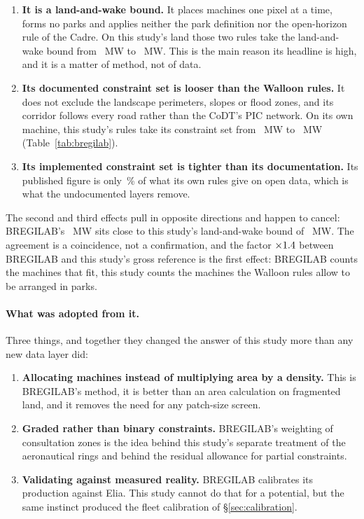\documentclass[11pt,a4paper]{article}
\begin{document}
\begin{enumerate}
  \item \textbf{It is a land-and-wake bound.} It places machines one pixel at a
    time, forms no parks and applies neither the park definition nor the
    open-horizon rule of the Cadre. On this study's land those two rules take
    the land-and-wake bound from \FreePnom{}~MW to \PlacePnom{}~MW. This is the
    main reason its headline is high, and it is a matter of method, not of
    data.
  \item \textbf{Its documented constraint set is looser than the Walloon
    rules.} It does not exclude the landscape perimeters, slopes or flood zones,
    and its corridor follows every road rather than the CoDT's PIC network. On
    its own machine, this study's rules take its constraint set from
    \BregEmuGrossMW{}~MW to \BregBridgeEndMW{}~MW (Table~\ref{tab:bregilab}).
  \item \textbf{Its implemented constraint set is tighter than its
    documentation.} Its published figure is only \BregReportedShare{}\,\% of
    what its own rules give on open data, which is what the undocumented layers
    remove.
\end{enumerate}

The second and third effects pull in opposite directions and happen to cancel:
BREGILAB's \BregTotal{}~MW sits close to this study's land-and-wake bound of
\FreePnom{}~MW. The agreement is a coincidence, not a confirmation, and the
factor $\times1.4$ between BREGILAB and this study's gross
reference is the first effect: BREGILAB counts the machines that fit, this study
counts the machines the Walloon rules allow to be arranged in parks.

\paragraph{What was adopted from it.} Three things, and together they changed
the answer of this study more than any new data layer did:

\begin{enumerate}
  \item \textbf{Allocating machines instead of multiplying area by a density.}
    This is BREGILAB's method, it is better than an area calculation on
    fragmented land, and it removes the need for any patch-size screen.
  \item \textbf{Graded rather than binary constraints.} BREGILAB's weighting of
    consultation zones is the idea behind this study's separate treatment of the
    aeronautical rings and behind the residual allowance for partial
    constraints.
  \item \textbf{Validating against measured reality.} BREGILAB calibrates its
    production against Elia. This study cannot do that for a potential, but the
    same instinct produced the fleet calibration of §\ref{sec:calibration}.
\end{enumerate}
\end{document}
